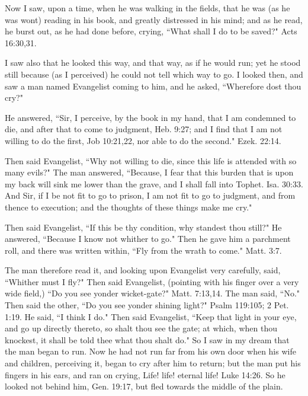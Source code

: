 Now I saw, upon a time, when he was walking in the fields, that he was (as he was wont) reading in his book, and greatly distressed in his mind; and as he read, he burst out, as he had done before, crying, ``What shall I do to be saved?" Acts 16:30,31. 

I saw also that he looked this way, and that way, as if he would run; yet he stood still because (as I perceived) he could not tell which way to go. I looked then, and saw a man named Evangelist coming to him, and he asked, ``Wherefore dost thou cry?" 

He answered, ``Sir, I perceive, by the book in my hand, that I am condemned to die, and after that to come to judgment, Heb. 9:27; and I find that I am not willing to do the first, Job 10:21,22, nor able to do the second." Ezek. 22:14. 

Then said Evangelist, ``Why not willing to die, since this life is attended with so many evils?" The man answered, ``Because, I fear that this burden that is upon my back will sink me lower than the grave, and I shall fall into Tophet. Isa. 30:33. And Sir, if I be not fit to go to prison, I am not fit to go to judgment, and from thence to execution; and the thoughts of these things make me cry." 

Then said Evangelist, ``If this be thy condition, why standest thou still?" He answered, ``Because I know not whither to go." Then he gave him a parchment roll, and there was written within, ``Fly from the wrath to come." Matt. 3:7. 

The man therefore read it, and looking upon Evangelist very carefully, said, ``Whither must I fly?" Then said Evangelist, (pointing with his finger over a very wide field,) ``Do you see yonder wicket-gate?" Matt. 7:13,14. The man said, ``No." Then said the other, ``Do you see yonder shining light?" Psalm 119:105; 2 Pet. 1:19. He said, ``I think I do." Then said Evangelist, ``Keep that light in your eye, and go up directly thereto, so shalt thou see the gate; at which, when thou knockest, it shall be told thee what thou shalt do." So I saw in my dream that the man began to run. Now he had not run far from his own door when his wife and children, perceiving it, began to cry after him to return; but the man put his fingers in his ears, and ran on crying, Life! life! eternal life! Luke 14:26. So he looked not behind him, Gen. 19:17, but fled towards the middle of the plain. 

